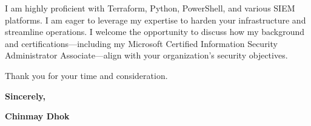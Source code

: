\documentclass[11pt, letterpaper]{article}
\begin{document}
\begin{minipage}[t][\textheight]{5.2in}
    I am highly proficient with Terraform, Python, PowerShell, and various SIEM platforms. I am eager to leverage my expertise to harden your infrastructure and streamline operations. I welcome the opportunity to discuss how my background and certifications---including my Microsoft Certified Information Security Administrator Associate---align with your organization's security objectives.
    
    Thank you for your time and consideration.
    
    \vspace{0.4in}
    
    \textbf{Sincerely,}
    
    \vspace{0.2in}
    
    {\Large \textbf{Chinmay Dhok}}
    
\end{minipage}
\end{document}
